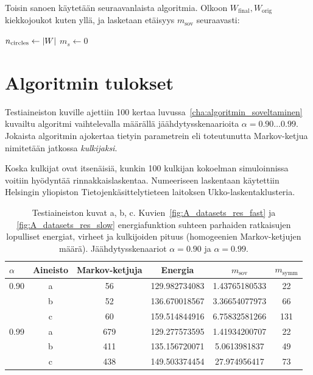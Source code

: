 Toisin sanoen käytetään seuraavanlaista algoritmia.
Olkoon $W_\text{final}, W_\text{orig}$  kiekkojoukot kuten yllä, ja lasketaan etäisyys $m_\text{sov}$ seuraavasti:
\begin{algorithm}[h]
    \BlankLine
    $n_\text{circles} \leftarrow \lvert W\rvert$ \;
    $m_s \leftarrow 0$\;
\end{algorithm}


\section{Algoritmin tulokset}
\label{sec:algoritmin_tulokset}

Testiaineiston kuville ajettiin 100 kertaa luvussa~\ref{cha:algoritmin_soveltaminen} kuvailtu algoritmi vaihtelevalla määrällä jäähdytysskenaarioita $\alpha = 0.90 \dots 0.99$.
Jokaista algoritmin ajokertaa tietyin parametrein eli toteutunutta Markov-ketjua nimitetään jatkossa \emph{kulkijaksi}.

Koska kulkijat ovat itsenäisiä, kunkin 100 kulkijan kokoelman simuloinnissa voitiin hyödyntää rinnakkaislaskentaa.
Numeeriseen laskentaan käytettiin Helsingin yliopiston Tietojenkäsittelytieteen laitoksen Ukko-laskentaklusteria.

\begin{table}[htpb]
    \centering
    \caption{Testiaineiston kuvat a, b, c. Kuvien~\ref{fig:A_datasets_res_fast} ja \ref{fig:A_datasets_res_slow} energiafunktion suhteen parhaiden ratkaisujen lopulliset energiat, virheet ja kulkijoiden pituus (homogeenien Markov-ketjujen määrä). Jäähdytysskenaariot $\alpha = 0.90$ ja $\alpha = 0.99$.
        \label{tab:A_res_fast_errors}
    }
    \begin{tabular}{l c c c c c}
        $\alpha$ & Aineisto & Markov-ketjuja & Energia & $m_\text{sov}$ & $m_\text{symm}$ \\[2pt]
        \hline\noalign{\smallskip}
        0.90 & a & 56 & 129.982734083 & 1.43765180533 & 22 \\
             & b & 52 & 136.670018567 & 3.36654077973 & 66 \\
             & c & 60 & 159.514844916 & 6.75832581266 & 131 \\[1pt]
        \hline\noalign{\smallskip}
        0.99 & a & 679 & 129.277573595 & 1.41934200707 & 22\\
             & b & 411 & 135.156720071 & 5.0613981837 & 49\\
             & c & 438 & 149.503374454 & 27.974956417 & 73
    \end{tabular}
\end{table}

